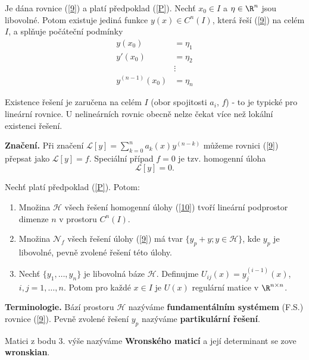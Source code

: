 \begin{veta}
Je dána rovnice (\ref{9}) a platí předpoklad (\ref{P}). Nechť $x_0 \in I$ a $\eta \in \R^n$ jsou libovolné. Potom existuje jediná funkce $y(x) \in C^n(I)$, která řeší (\ref{9}) na celém $I$, a splňuje počáteční podmínky
\[
\begin{aligned}
y(x_0) &= \eta_1 \\
y'(x_0) &= \eta_2 \\
&\vdots \\
y^{(n-1)}(x_0) &= \eta_n
\end{aligned}
\]
\end{veta}

\begin{poznamka}
Existence řešení je zaručena na celém $I$ (obor spojitosti $a_i$, $f$) - to je typické pro lineární rovnice. U nelineárních rovnic obecně nelze čekat více než lokální existenci řešení.
\end{poznamka}

\textbf{Značení.} Při značení $\mathcal L [y] = \sum_{k=0}^n a_k(x) y^{(n-k)}$ můžeme rovnici (\ref{9}) přepsat jako $\mathcal L [y] = f$. Speciální případ $f = 0$ je tzv. homogenní úloha
\begin{equation}\label{10}
\mathcal L [y] = 0.
\end{equation}

\begin{veta}
Nechť platí předpoklad (\ref{P}). Potom:
\begin{enumerate}
    \item Množina $\mathcal {H}$ všech řešení homogenní úlohy (\ref{10}) tvoří lineární podprostor dimenze $n$ v prostoru $C^n(I)$.
    \item Množina $\mathcal {N}_f$ všech řešení úlohy (\ref{9}) má tvar $\{y_p + y; y \in \mathcal {H}\}$, kde $y_p$ je libovolné, pevně zvolené řešení této úlohy.
    \item Nechť $\{y_1, \ldots, y_n\}$ je libovolná báze $\mathcal {H}$. Definujme $U_{ij}(x) = y_j^{(i-1)}(x)$, $i,j = 1, \dots, n$. Potom pro každé $x \in I$ je $U(x)$ regulární matice v $\R^{n \times n}$.
\end{enumerate}
\end{veta}

\textbf{Terminologie.} Bází prostoru $\mathcal {H}$ nazýváme \textbf{fundamentálním systémem} (F.S.) rovnice (\ref{9}). Pevně zvolené řešení $y_p$ nazýváme \textbf{partikulární řešení}.

Matici z bodu 3. výše nazýváme \textbf{Wronského maticí} a její determinant se zove \textbf{wronskian}.

